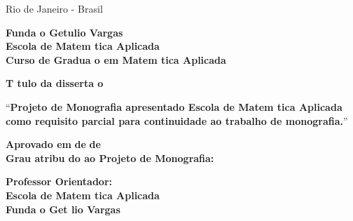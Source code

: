 \documentclass{article}
\begin{document}
\par
\vfill
\begin{center}
{{\normalsize Rio de Janeiro - Brasil}\\
{\normalsize \the\year}}
\end{center}

\thispagestyle{empty}

\newpage
\begin{center}
\textbf{\LARGE Funda o Getulio Vargas}\\ 
\textbf{\LARGE Escola de Matem tica Aplicada}\\
\textbf{\LARGE Curso de Gradua o em Matem tica Aplicada}

\par
\vspace{100pt}
\textbf{\Large T tulo da disserta o}


\par
\vspace{65pt}

``\textbf{Projeto de Monografia apresentado   Escola de Matem tica Aplicada como requisito parcial para continuidade ao trabalho de monografia.}''
\end{center}

\par
\vspace{65pt}
\begin{center}

\textbf{Aprovado em } \makebox[30pt]{\hrulefill}\textbf{ de }\makebox[120pt]{\hrulefill}\textbf{ de }\makebox[50pt]{\hrulefill}
\\
\vspace{5pt}
\textbf{Grau atribu do ao Projeto de Monografia:} \makebox[30pt]{\hrulefill}\\
\end{center}


\par
\vspace{40pt}
\begin{center}

\hrulefill

\vspace{5pt}
\textbf{Professor Orientador: }\\
\textbf{Escola de Matem tica Aplicada}\\
\textbf{Funda o Get lio Vargas}
\end{center}

\thispagestyle{empty}


\newpage

\thispagestyle{empty}
\end{document}
